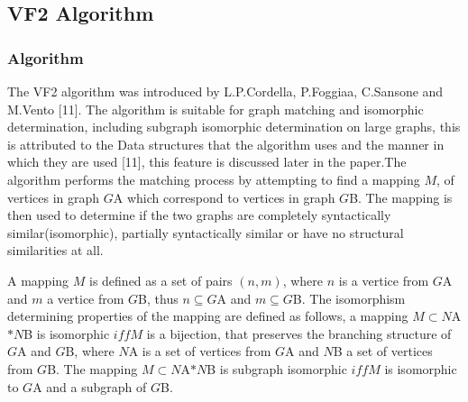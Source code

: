  \subsection{VF2 Algorithm}
\label{VF2 Algorithm}

\subsubsection{Algorithm}

 The VF2 algorithm was introduced by L.P.Cordella, P.Foggiaa, C.Sansone and M.Vento [11]. The algorithm is suitable for graph matching and isomorphic determination, including subgraph isomorphic determination on large graphs, this is attributed to the Data structures that the algorithm uses and the manner in which they are used [11], this feature is discussed later in the paper.\newline\newline The algorithm performs the matching process by attempting to find a mapping $M$, of vertices in graph $G${\tiny A} which correspond to vertices in graph $G${\tiny B}. The mapping is then used to determine if the two graphs are completely syntactically similar(isomorphic), partially syntactically similar or have no structural similarities at all.

A mapping $M$ is defined as a set of pairs $(n,m)$, where $n$ is a vertice from $G${\tiny A} and $m$ a vertice from $G${\tiny B}, thus $n \subseteq G${\tiny A} and $m \subseteq G${\tiny B}.\newline\newline
The isomorphism determining properties of the mapping are defined as follows, a mapping $M \subset N${\tiny A} $ * N${\tiny B} is isomorphic $iff M$ is a bijection, that preserves the branching structure of $G${\tiny A} and $G${\tiny B}, where $N${\tiny A} is a set of vertices from $G${\tiny A} and $N${\tiny B} a set of vertices from $G${\tiny B}.\newline\newline
The mapping $M \subset N${\tiny A}$ * N${\tiny B} is subgraph isomorphic $iff M$ is isomorphic to $G${\tiny A} and a subgraph of $G${\tiny B}.

